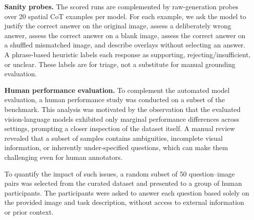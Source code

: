 \textbf{Sanity probes.}
The scored runs are complemented by raw-generation probes over 20 spatial CoT examples per model. For each example, we ask the model to justify the correct answer on the original image, assess a deliberately wrong answer, assess the correct answer on a blank image, assess the correct answer on a shuffled mismatched image, and describe overlays without selecting an answer. A phrase-based heuristic labels each response as supporting, rejecting/insufficient, or unclear. These labels are for triage, not a substitute for manual grounding evaluation.

\textbf{Human performance evaluation.}
To complement the automated model evaluation, a human performance study was conducted on a subset of the benchmark. This analysis was motivated by the observation that the evaluated vision-language models exhibited only marginal performance differences across settings, prompting a closer inspection of the dataset itself. A manual review revealed that a subset of samples contains ambiguities, incomplete visual information, or inherently under-specified questions, which can make them challenging even for human annotators.

To quantify the impact of such issues, a random subset of 50 question–image pairs was selected from the curated dataset and presented to a group of human participants. The participants were asked to answer each question based solely on the provided image and task description, without access to external information or prior context.
